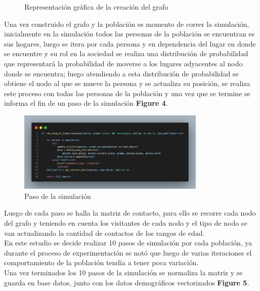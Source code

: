 \documentclass{article}
\begin{document}
\begin{figure}[h]
  \centering
  \caption{Representación gráfica de la creación del grafo}
\end{figure} 

\newpage

Una vez construido el grafo y la población es momento de correr la simulación, inicialmente en la simulación todos las personas de la población se encuentran es sus hogares, luego se itera por cada persona y en dependencia del lugar en donde se encuentre y su rol en la sociedad se realiza una distribución de probabilidad que representar\'a la probabilidad de moverse a los lugares adyacentes al nodo donde se encuentra; luego atendiendo a esta distribución de probabilidad se obtiene el nodo al que se mueve la persona y se actualiza su posici\'on, se realiza este proceso con todas las personas de la población y una vez que se termine se informa el fin de un paso de la simulación \textbf{Figure 4}.\\
\begin{figure}[h]
        \centering
        \includegraphics[width=0.8\textwidth,height=0.3\textheight]{step_of_simulation.png}
        \centering
        \caption{Paso de la simulación}
    \end{figure}

Luego de cada paso se halla la matriz de contacto, para ello se recorre cada nodo del grafo y teniendo en cuenta los visitantes de cada nodo y el tipo de nodo se van actualizando la cantidad de contactos de los rangos de edad.\\
En este estudio se decide realizar 10 pasos de simulación por cada población, ya durante el proceso de experimentación se notó que luego de varias iteraciones el comportamiento de la población tendía a tener poca variación.\\
Una vez terminados los 10 pasos de la simulación se normaliza la matriz y se guarda en base datos, junto con los datos demográficos vectorizados \textbf{Figure 5}.
\end{document}
